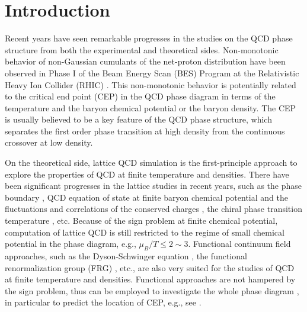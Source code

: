 \documentclass[%
reprint,
superscriptaddress,
showpacs,preprintnumbers,
 amsmath,amssymb,
 aps,
prd,
]{revtex4-1}
\begin{document}
\section{Introduction}
\label{sec:int}

Recent years have seen remarkable progresses in the studies on the QCD phase structure from both the experimental and theoretical sides. Non-monotonic behavior of non-Gaussian cumulants of the net-proton distribution have been observed in Phase I of the Beam Energy Scan (BES) Program at the Relativistic Heavy Ion Collider (RHIC) \cite{Adamczyk:2013dal,Luo:2015ewa,Luo:2017faz}. This non-monotonic behavior is potentially related to the critical end point (CEP) in the QCD phase diagram in terms of the temperature and the baryon chemical potential or the baryon density. The CEP is usually believed to be a key feature of the QCD phase structure, which separates the first order phase transition at high density from the continuous crossover at low density. 

On the theoretical side, lattice QCD simulation is the first-principle approach to explore the properties of QCD at finite temperature and densities. There have been significant progresses in the lattice studies in recent years, such as the phase boundary \cite{Bellwied:2015rza,Bazavov:2018mes}, QCD equation of state at finite baryon chemical potential and the fluctuations and correlations of the conserved charges \cite{Bazavov:2017dus,Bazavov:2017tot,Borsanyi:2018grb}, the chiral phase transition temperature \cite{Ding:2019prx}, etc. Because of the sign problem at finite chemical potential, computation of lattice QCD is still restricted to the regime of small chemical potential in the phase diagram, e.g., $\mu_B/T\le 2\sim 3$. Functional continuum field approaches, such as the Dyson-Schwinger equation \cite{Fischer:2018sdj}, the functional renormalization group (FRG) \cite{Pawlowski:2005xe}, etc., are also very suited for the studies of QCD at finite temperature and densities. Functional approaches are not hampered by the sign problem, thus can be employed to investigate the whole phase diagram \cite{Schaefer:2004en,Herbst:2013ail,Fischer:2018sdj}, in particular to predict the location of CEP, e.g., see \cite{Braun:2009gm,Fischer:2014ata,Gao:2015kea,Fu:2019a}.
\end{document}
